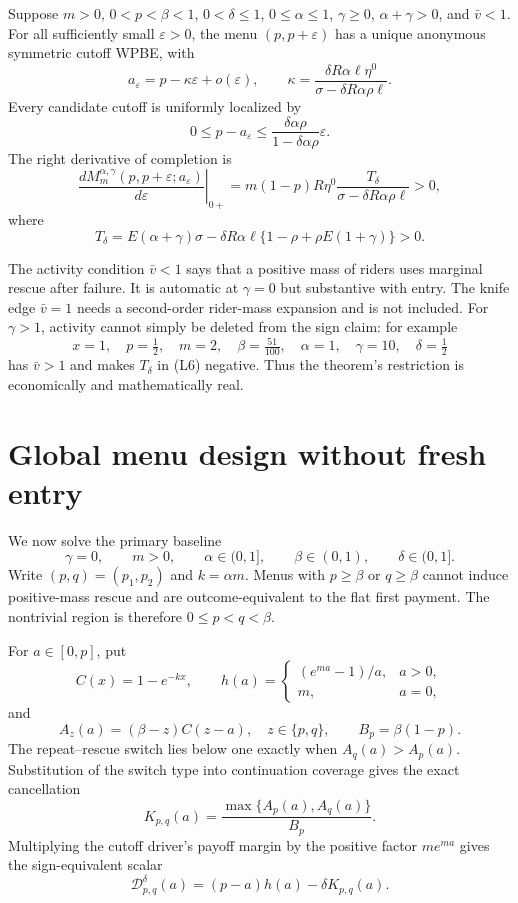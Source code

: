 \documentclass[mnsc,dblanonrev]{informs4}
\begin{document}
\begin{theorem}
\label{thm:localentry}
Suppose $m>0$, $0<p<\beta<1$, $0<\delta\le1$,
$0\le\alpha\le1$, $\gamma\ge0$,
$\alpha+\gamma>0$, and $\bar v<1$.  For all sufficiently small
$\varepsilon>0$, the menu $(p,p+\varepsilon)$ has a unique anonymous
symmetric cutoff WPBE, with
\[
 a_\varepsilon=p-\kappa\varepsilon+o(\varepsilon),\qquad
 \kappa=\frac{\delta R\alpha\ell\eta^0}
 {\sigma-\delta R\alpha\rho\ell}.                       \tag{L3}
\]
Every candidate cutoff is uniformly localized by
\[
 0\le p-a_\varepsilon
 \le\frac{\delta\alpha\rho}{1-\delta\alpha\rho}
 \varepsilon.                                                \tag{L4}
\]
The right derivative of completion is
\[
 \left.\frac{dM_m^{\alpha,\gamma}(p,p+\varepsilon;
 a_\varepsilon)}{d\varepsilon}\right|_{0+}
 =m(1-p)R\eta^0
 \frac{T_\delta}{\sigma-\delta R\alpha\rho\ell}>0,       \tag{L5}
\]
where
\[
 T_\delta=E(\alpha+\gamma)\sigma
 -\delta R\alpha\ell\{1-\rho+\rho E(1+\gamma)\}>0.       \tag{L6}
\]
\end{theorem}

The activity condition $\bar v<1$ says that a positive mass of riders uses
marginal rescue after failure.  It is automatic at $\gamma=0$ but substantive
with entry.  The knife edge $\bar v=1$ needs a second-order rider-mass
expansion and is not included.  For $\gamma>1$, activity cannot simply be
deleted from the sign claim: for example
\[
 x=1,\quad p=\tfrac12,\quad m=2,\quad \beta=\tfrac{51}{100},
 \quad\alpha=1,\quad\gamma=10,\quad\delta=\tfrac12
\]
has $\bar v>1$ and makes $T_\delta$ in (L6) negative.  Thus the
theorem's restriction is economically and mathematically real.

\section{Global menu design without fresh entry}
\label{sec:global}

We now solve the primary baseline
\[
 \gamma=0,\qquad m>0,\qquad \alpha\in(0,1],\qquad
 \beta\in(0,1),\qquad \delta\in(0,1].
\]
Write $(p,q)=(p_1,p_2)$ and $k=\alpha m$.  Menus with $p\ge\beta$ or
$q\ge\beta$ cannot induce positive-mass rescue and are outcome-equivalent to
the flat first payment.  The nontrivial region is therefore
$0\le p<q<\beta$.

For $a\in[0,p]$, put
\[
 C(x)=1-e^{-kx},\qquad
 h(a)=\begin{cases}(e^{ma}-1)/a,&a>0,\\m,&a=0,\end{cases}   \tag{14}
\]
and
\[
 A_z(a)=(\beta-z)C(z-a),\quad z\in\{p,q\},
 \qquad B_p=\beta(1-p).                                    \tag{15}
\]
The repeat--rescue switch lies below one exactly when $A_q(a)>A_p(a)$.
Substitution of the switch type into continuation coverage gives the exact
cancellation
\[
 K_{p,q}(a)
 =\frac{\max\{A_p(a),A_q(a)\}}{B_p}.                       \tag{16}
\]
Multiplying the cutoff driver's payoff margin by the positive factor
$me^{ma}$ gives the sign-equivalent scalar
\[
 \mathcal D_{p,q}^{\delta}(a)
 =(p-a)h(a)-\delta K_{p,q}(a).                             \tag{17}
\]
\end{document}
